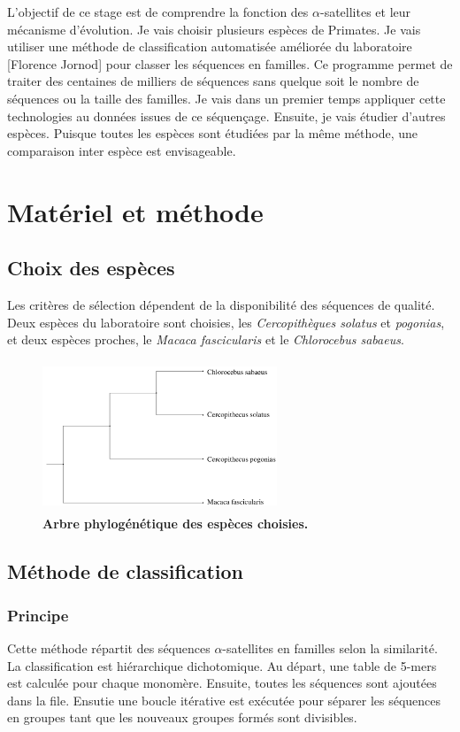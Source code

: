 \documentclass[12pt,a4paper]{article}
\begin{document}
L'objectif de ce stage est de comprendre la fonction des $\alpha$-satellites et leur mécanisme d'évolution. Je vais choisir plusieurs espèces de Primates. Je vais utiliser une méthode de classification automatisée améliorée du laboratoire [Florence Jornod] pour classer les séquences en familles.  Ce programme permet de traiter des centaines de milliers de séquences sans quelque soit le nombre de séquences ou la taille des familles. Je vais dans un premier temps appliquer cette technologies au données issues de ce séquençage. Ensuite, je vais étudier d'autres espèces. Puisque toutes les espèces sont étudiées par la  même méthode, une comparaison inter espèce est envisageable. 

\section{Matériel et méthode}
\subsection{Choix des espèces}
Les critères de sélection dépendent de la disponibilité des séquences de qualité. Deux espèces du laboratoire sont choisies, les \textit{Cercopithèques solatus} et \textit{pogonias}, et deux espèces proches, le \textit{Macaca fascicularis} et le \textit{Chlorocebus sabaeus}.  
	\begin{figure}
		\center
		\includegraphics[height=4.5cm, width=7cm]{img/arbre_especes.png}
		\caption{\textbf{Arbre phylogénétique des espèces choisies.}}
	\end{figure}

\subsection{Méthode de classification}
	\subsubsection{Principe}
Cette méthode \cite{rapport_florence} répartit des séquences $\alpha$-satellites en familles selon la similarité. La classification est hiérarchique dichotomique. Au départ, une table de 5-mers est calculée pour chaque monomère.  Ensuite, toutes les séquences sont ajoutées dans la file. Ensutie une boucle itérative est exécutée pour séparer les séquences en groupes tant que les nouveaux groupes formés sont divisibles.
\end{document}
